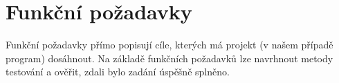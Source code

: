 \documentclass[thesis=B,czech]{FITthesis}[2012/06/26]
\begin{document}
%
%




\section{Funkční požadavky}

Funkční požadavky přímo popisují cíle, kterých má projekt (v našem případě program) dosáhnout. Na základě funkčních požadavků lze navrhnout metody testování a ověřit, zdali bylo zadání úspěšně splněno.
\end{document}
